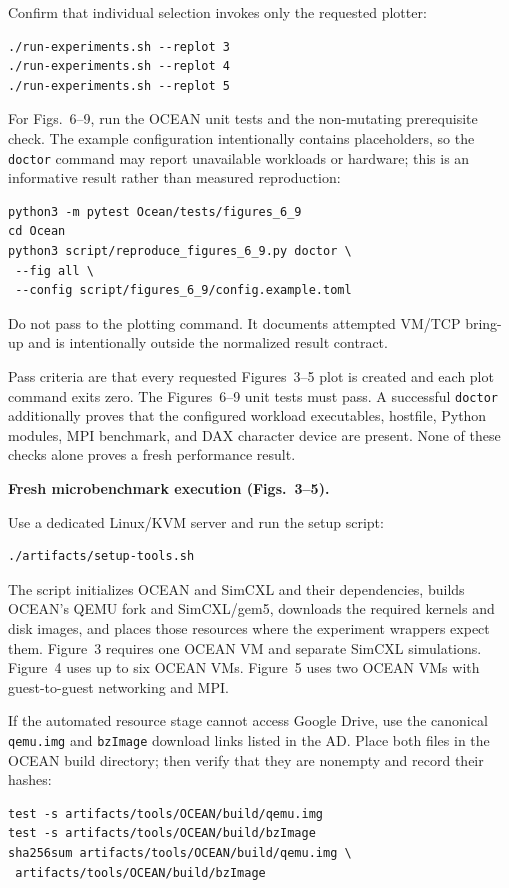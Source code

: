 \documentclass[conference]{IEEEtran}
\begin{document}
\artcomp

Confirm that individual selection invokes only the requested plotter:
\begin{verbatim}
./run-experiments.sh --replot 3
./run-experiments.sh --replot 4
./run-experiments.sh --replot 5
\end{verbatim}
For Figs.~6--9, run the OCEAN unit tests and the non-mutating prerequisite
check.  The example configuration intentionally contains placeholders, so the
\texttt{doctor} command may report unavailable workloads or hardware; this is
an informative result rather than measured reproduction:
\begin{verbatim}
python3 -m pytest Ocean/tests/figures_6_9
cd Ocean
python3 script/reproduce_figures_6_9.py doctor \
 --fig all \
 --config script/figures_6_9/config.example.toml
\end{verbatim}
Do not pass  to the plotting command.
It documents attempted VM/TCP bring-up and is intentionally outside the
normalized result contract.

\artout

Pass criteria are that every requested Figures~3--5 plot is created and each
plot command exits zero.  The Figures~6--9 unit tests must pass.  A successful
\texttt{doctor} additionally proves that the configured workload executables,
hostfile, Python modules, MPI benchmark, and DAX character device are present.
None of these checks alone proves a fresh performance result.

\noindent\textbf{Fresh microbenchmark execution (Figs.~3--5).}

\artin

Use a dedicated Linux/KVM server and run the setup script:
\begin{verbatim}
./artifacts/setup-tools.sh
\end{verbatim}
The script initializes OCEAN and SimCXL and their dependencies, builds
OCEAN's QEMU fork and SimCXL/gem5, downloads the required kernels and disk
images, and places those resources where the experiment wrappers expect them.
Figure~3 requires one OCEAN VM and separate SimCXL simulations.  Figure~4 uses
up to six OCEAN VMs.  Figure~5 uses two OCEAN VMs with guest-to-guest
networking and MPI.

If the automated resource stage cannot access Google Drive, use the canonical
\texttt{qemu.img} and \texttt{bzImage} download links listed in the AD.  Place
both files in the OCEAN build directory; then verify that they are nonempty and
record their hashes:
\begin{verbatim}
test -s artifacts/tools/OCEAN/build/qemu.img
test -s artifacts/tools/OCEAN/build/bzImage
sha256sum artifacts/tools/OCEAN/build/qemu.img \
 artifacts/tools/OCEAN/build/bzImage
\end{verbatim}
\end{document}
